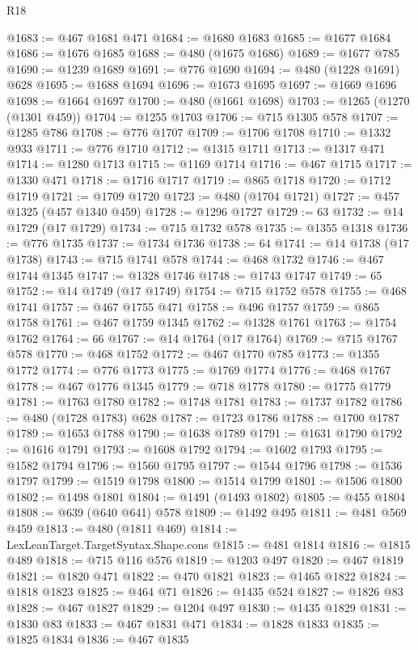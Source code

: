 \begin{lexlean}{R18}
\begin{coremodule}
@1683 := @467 @1681 @471
@1684 := @1680 @1683
@1685 := @1677 @1684
@1686 := @1676 @1685
@1688 := @480 (@1675 @1686)
@1689 := @1677 @785
@1690 := @1239 @1689
@1691 := @776 @1690
@1694 := @480 (@1228 @1691) @628
@1695 := @1688 @1694
@1696 := @1673 @1695
@1697 := @1669 @1696
@1698 := @1664 @1697
@1700 := @480 (@1661 @1698)
@1703 := @1265 (@1270 (@1301 @459))
@1704 := @1255 @1703
@1706 := @715 @1305 @578
@1707 := @1285 @786
@1708 := @776 @1707
@1709 := @1706 @1708
@1710 := @1332 @933
@1711 := @776 @1710
@1712 := @1315 @1711
@1713 := @1317 @471
@1714 := @1280 @1713
@1715 := @1169 @1714
@1716 := @467 @1715
@1717 := @1330 @471
@1718 := @1716 @1717
@1719 := @865 @1718
@1720 := @1712 @1719
@1721 := @1709 @1720
@1723 := @480 (@1704 @1721)
@1727 := @457 @1325 (@457 @1340 @459)
@1728 := @1296 @1727
@1729 := 63
@1732 := @14 @1729 (@17 @1729)
@1734 := @715 @1732 @578
@1735 := @1355 @1318
@1736 := @776 @1735
@1737 := @1734 @1736
@1738 := 64
@1741 := @14 @1738 (@17 @1738)
@1743 := @715 @1741 @578
@1744 := @468 @1732
@1746 := @467 @1744 @1345
@1747 := @1328 @1746
@1748 := @1743 @1747
@1749 := 65
@1752 := @14 @1749 (@17 @1749)
@1754 := @715 @1752 @578
@1755 := @468 @1741
@1757 := @467 @1755 @471
@1758 := @496 @1757
@1759 := @865 @1758
@1761 := @467 @1759 @1345
@1762 := @1328 @1761
@1763 := @1754 @1762
@1764 := 66
@1767 := @14 @1764 (@17 @1764)
@1769 := @715 @1767 @578
@1770 := @468 @1752
@1772 := @467 @1770 @785
@1773 := @1355 @1772
@1774 := @776 @1773
@1775 := @1769 @1774
@1776 := @468 @1767
@1778 := @467 @1776 @1345
@1779 := @718 @1778
@1780 := @1775 @1779
@1781 := @1763 @1780
@1782 := @1748 @1781
@1783 := @1737 @1782
@1786 := @480 (@1728 @1783) @628
@1787 := @1723 @1786
@1788 := @1700 @1787
@1789 := @1653 @1788
@1790 := @1638 @1789
@1791 := @1631 @1790
@1792 := @1616 @1791
@1793 := @1608 @1792
@1794 := @1602 @1793
@1795 := @1582 @1794
@1796 := @1560 @1795
@1797 := @1544 @1796
@1798 := @1536 @1797
@1799 := @1519 @1798
@1800 := @1514 @1799
@1801 := @1506 @1800
@1802 := @1498 @1801
@1804 := @1491 (@1493 @1802)
@1805 := @455 @1804
@1808 := @639 (@640 @641) @578
@1809 := @1492 @495
@1811 := @481 @569 @459
@1813 := @480 (@1811 @469)
@1814 := LexLeanTarget.TargetSyntax.Shape.cons
@1815 := @481 @1814
@1816 := @1815 @489
@1818 := @715 @116 @576
@1819 := @1203 @497
@1820 := @467 @1819
@1821 := @1820 @471
@1822 := @470 @1821
@1823 := @1465 @1822
@1824 := @1818 @1823
@1825 := @464 @71
@1826 := @1435 @524
@1827 := @1826 @83
@1828 := @467 @1827
@1829 := @1204 @497
@1830 := @1435 @1829
@1831 := @1830 @83
@1833 := @467 @1831 @471
@1834 := @1828 @1833
@1835 := @1825 @1834
@1836 := @467 @1835

\end{coremodule}
\end{lexlean}
